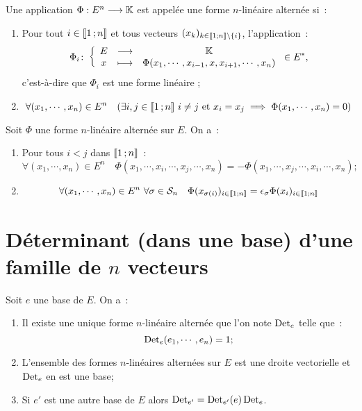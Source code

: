 \begin{defdef}
	Une application $\Phi : E^n \longrightarrow \mathbb{K}$ est appelée une forme $n$-linéaire alternée si~:
	\begin{enumerate}
		\item Pour tout $i \in \mathopen{\llbracket}1\mathclose{}\mathpunct{};n\mathclose{\rrbracket}$ et tous vecteurs $(x_k)_{k \in \mathopen{\llbracket}1\mathclose{}\mathpunct{};n\mathclose{\rrbracket} \setminus \{i\}}$, l'application~:
		\begin{equation}
			\Phi_i\colon \left\{\begin{array}{ccc} E & \longrightarrow &\mathbb{K}\\ x & \longmapsto & \Phi(x_1,\cdots,x_{i-1},x,x_{i+1},\cdots,x_n) \end{array} \right. \in E^*,
		\end{equation}
		c'est-à-dire que $\Phi_i$ est une forme linéaire ;
		\item
		\begin{equation}
			\forall (x_1, \cdots, x_n) \in E^n \quad (\exists i,j \in \intervalleentier{1}{n} \ i \neq j \ \text{et} \ x_i=x_j \implies \Phi(x_1, \cdots, x_n) = 0) 
		\end{equation}		
	\end{enumerate}
\end{defdef}

\begin{prop}
	Soit $\Phi$ une forme $n$-linéaire alternée sur $E$. On a~:
	\begin{enumerate}
		\item Pour tous $i < j$ dans $\mathopen{\llbracket}1\mathclose{}\mathpunct{};n\mathclose{\rrbracket}$~:
		\begin{equation}
			\forall (x_1, \cdots, x_n) \in E^n \quad \Phi(x_1, \cdots, x_i, \cdots, x_j, \cdots,x_n) = - \Phi(x_1, \cdots, x_j, \cdots, x_i, \cdots,x_n) ;
		\end{equation}
		\item 
		\begin{equation}
			\forall (x_1, \cdots, x_n) \in E^n \ \forall \sigma \in \S_n \quad \Phi(x_{\sigma(i)})_{i \in \intervalleentier{1}{n}} = \epsilon_\sigma \Phi(x_{i})_{i \in \intervalleentier{1}{n}}
		\end{equation}
	\end{enumerate}
\end{prop}

\section[Déterminant]{Déterminant (dans une base) d'une famille de $n$ vecteurs}

\begin{theo}	
	Soit $e$ une base de $E$. On a~:
	\begin{enumerate}
		\item Il existe une unique forme $n$-linéaire alternée que l'on note $\operatorname{Det}_e$ telle que~:
		\begin{equation}
			\operatorname{Det}_e(e_1, \cdots, e_n)=1;
		\end{equation}
	\item L'ensemble des formes $n$-linéaires alternées sur $E$ est une droite vectorielle et $\operatorname{Det}_e$ en est une base;
	\item Si $e'$ est une autre base de $E$ alors $\operatorname{Det}_{e'} = \operatorname{Det}_{e'}(e) \operatorname{Det}_{e}$.
	\end{enumerate}
\end{theo}

